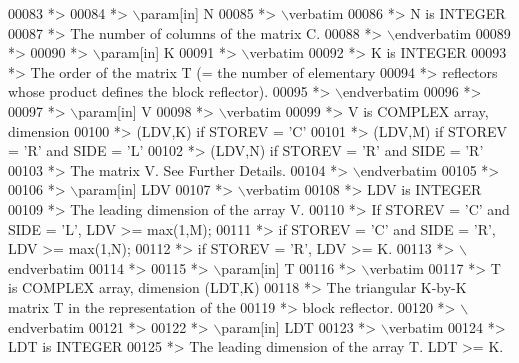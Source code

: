 \begin{DoxyCode}
00083 \textcolor{comment}{*>}
00084 \textcolor{comment}{*> \(\backslash\)param[in] N}
00085 \textcolor{comment}{*> \(\backslash\)verbatim}
00086 \textcolor{comment}{*>          N is INTEGER}
00087 \textcolor{comment}{*>          The number of columns of the matrix C.}
00088 \textcolor{comment}{*> \(\backslash\)endverbatim}
00089 \textcolor{comment}{*>}
00090 \textcolor{comment}{*> \(\backslash\)param[in] K}
00091 \textcolor{comment}{*> \(\backslash\)verbatim}
00092 \textcolor{comment}{*>          K is INTEGER}
00093 \textcolor{comment}{*>          The order of the matrix T (= the number of elementary}
00094 \textcolor{comment}{*>          reflectors whose product defines the block reflector).}
00095 \textcolor{comment}{*> \(\backslash\)endverbatim}
00096 \textcolor{comment}{*>}
00097 \textcolor{comment}{*> \(\backslash\)param[in] V}
00098 \textcolor{comment}{*> \(\backslash\)verbatim}
00099 \textcolor{comment}{*>          V is COMPLEX array, dimension}
00100 \textcolor{comment}{*>                                (LDV,K) if STOREV = 'C'}
00101 \textcolor{comment}{*>                                (LDV,M) if STOREV = 'R' and SIDE = 'L'}
00102 \textcolor{comment}{*>                                (LDV,N) if STOREV = 'R' and SIDE = 'R'}
00103 \textcolor{comment}{*>          The matrix V. See Further Details.}
00104 \textcolor{comment}{*> \(\backslash\)endverbatim}
00105 \textcolor{comment}{*>}
00106 \textcolor{comment}{*> \(\backslash\)param[in] LDV}
00107 \textcolor{comment}{*> \(\backslash\)verbatim}
00108 \textcolor{comment}{*>          LDV is INTEGER}
00109 \textcolor{comment}{*>          The leading dimension of the array V.}
00110 \textcolor{comment}{*>          If STOREV = 'C' and SIDE = 'L', LDV >= max(1,M);}
00111 \textcolor{comment}{*>          if STOREV = 'C' and SIDE = 'R', LDV >= max(1,N);}
00112 \textcolor{comment}{*>          if STOREV = 'R', LDV >= K.}
00113 \textcolor{comment}{*> \(\backslash\)endverbatim}
00114 \textcolor{comment}{*>}
00115 \textcolor{comment}{*> \(\backslash\)param[in] T}
00116 \textcolor{comment}{*> \(\backslash\)verbatim}
00117 \textcolor{comment}{*>          T is COMPLEX array, dimension (LDT,K)}
00118 \textcolor{comment}{*>          The triangular K-by-K matrix T in the representation of the}
00119 \textcolor{comment}{*>          block reflector.}
00120 \textcolor{comment}{*> \(\backslash\)endverbatim}
00121 \textcolor{comment}{*>}
00122 \textcolor{comment}{*> \(\backslash\)param[in] LDT}
00123 \textcolor{comment}{*> \(\backslash\)verbatim}
00124 \textcolor{comment}{*>          LDT is INTEGER}
00125 \textcolor{comment}{*>          The leading dimension of the array T. LDT >= K.}

\end{DoxyCode}
